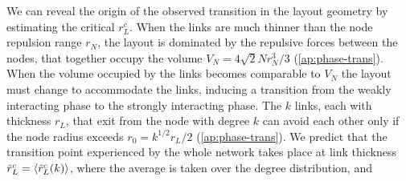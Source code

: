 \documentclass[endfloats,nofootinbib,preprint,floatfix,titlepage,superscriptaddress,linenumbers]{revtex4-1} %
\begin{document}
\begin{linenumbers}
We can reveal the origin of the observed transition in the layout geometry by estimating the critical $r_L^c$.
When the links are much thinner than the node repulsion range  $r_N$, the layout is dominated by the repulsive forces between the nodes,
that together occupy the volume $ V_N = 4 \sqrt{2} N r_N^3/3 $ (\ref{ap:phase-trans}). %
When the volume occupied by the links becomes comparable to $V_N$ the layout must change to accommodate the links, inducing a transition from the weakly interacting  phase to the strongly interacting phase. 
The $k$ links, each with thickness $r_L$, that exit from the node with degree $k$ can avoid each other only if the node  radius exceeds $r_0 = k^{1/2} r_L /2 $ (\ref{ap:phase-trans}). 
We predict that the %
transition point experienced by the whole network takes place at link thickness $\tilde{r}^c_L = \left<\tilde{r}^c_L(k)\right>$, 
where the average is taken over the degree distribution, and 
\end{linenumbers}
\end{document}

